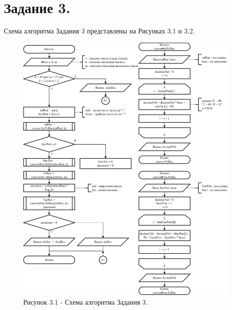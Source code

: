 \documentclass[oneside,a4paper,14pt]{extarticle} %
\begin{document}
\section*{Задание 3.}
\noindent Схема алгоритма Задания 3 представлены на Рисунках 3.1 и 3.2.\\
\begin{figure}[!ht]
	\centering
	\includegraphics[height=0.9\textheight]{pics/3-flowchart-p1.png}
	\caption*{Рисунок 3.1 - Схема алгоритма Задания 3.}
\end{figure}
\newpage
\end{document}
